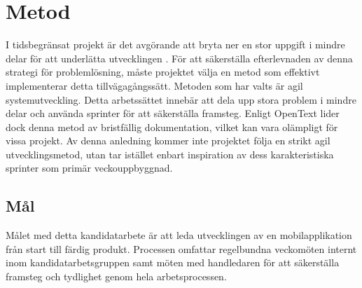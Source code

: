 \section{Metod}





I tidsbegränsat projekt är det avgörande att bryta ner en stor uppgift i mindre delar för att underlätta utvecklingen \cite{agile}. För att säkerställa efterlevnaden av denna strategi för problemlösning, måste projektet välja en metod som effektivt implementerar detta tillvägagångssätt. Metoden som har valts är agil systemutveckling. Detta arbetssättet innebär att dela upp stora problem i mindre delar och använda sprinter för att säkerställa framsteg. Enligt OpenText lider dock denna metod av bristfällig dokumentation, vilket kan vara olämpligt för vissa projekt. Av denna anledning kommer inte projektet följa en strikt agil utvecklingsmetod, utan tar istället enbart inspiration av dess karakteristiska sprinter som primär veckouppbyggnad.

\subsection{Mål}
Målet med detta kandidatarbete är att leda utvecklingen av en mobilapplikation från start till färdig produkt. Processen omfattar regelbundna veckomöten internt inom kandidatarbetsgruppen samt möten med handledaren för att säkerställa framsteg och tydlighet genom hela arbetsprocessen. 

